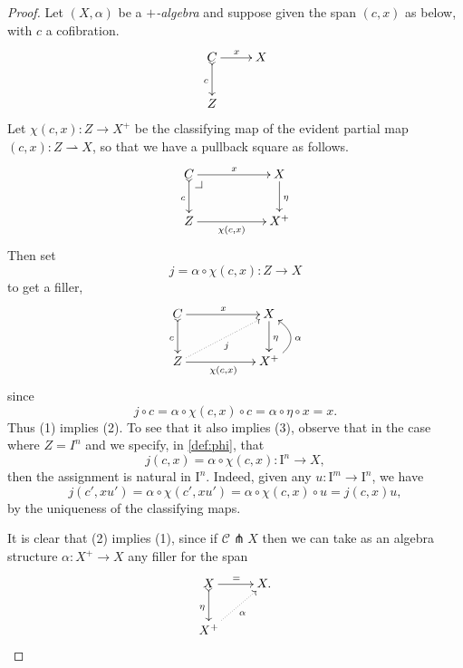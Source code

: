 \documentclass[12pt]{article}
\makeatletter
\newcommand{\ra}{\ensuremath{\rightarrow}}
\newcommand{\I}{\ensuremath{\mathrm{I}}}
\theoremstyle{remark}
\theoremstyle{definition}
\newcommand{\pbcorner}[1][dr]{\save*!/#1-1.2pc/#1:(-1,1)@^{|-}\restore}
\makeatother
\begin{document}
\begin{proof}
Let $(X, \alpha)$ be a \emph{$+$-algebra} and suppose given the span $(c,x)$ as below, with $c$ a cofibration. 
\begin{equation*}%
\xymatrix{
C \ar@{>->}[d]_{c} \ar[r]^{x} & X \\
Z &
}
\end{equation*}
Let $\chi(c,x): Z\ra X^+$ be the classifying map of the evident partial map $(c,x) : Z\rightharpoonup X$, so that we have a pullback square as follows.
\begin{equation}\label{diagram:defphi}
\xymatrix{
C \ar@{>->}[d]_{c} \ar[rr]^{x} \pbcorner && X \ar[d]^{\eta} \\
Z \ar[rr]_-{\chi(c,x)} && X^+
}
\end{equation}
Then set
\begin{equation}\label{def:phi}
j = \alpha\circ\chi(c,x) : Z\ra X
\end{equation}
to get a filler,
\begin{equation}\label{diagram:defphi}
\xymatrix{
C \ar@{>->}[d]_{c} \ar[rr]^{x} && X \ar[d]^{\eta} \\
Z\ar@{.>}[rru]_{j} \ar[rr]_{\chi(c,x)} && X^+  \ar@/_4ex/ [u]_\alpha
}
\end{equation}
since $$j\circ c = \alpha\circ\chi(c,x)\circ c = \alpha\circ\eta \circ x = x.$$ Thus (1) implies (2).  To see that it also implies (3), observe that in the case where $Z=I^n$ and we specify, in \eqref{def:phi}, that
\begin{equation}\label{def:j}
j(c,x) = \alpha\circ\chi(c,x) : \I^n\ra X,
\end{equation}
then the assignment is natural in $\I^n$. Indeed,  given any $u : \I^m \ra \I^n$, we have
\begin{equation}\label{eq:proof,uniformfillers}
j(c',xu') = \alpha\circ\chi(c',xu') = \alpha\circ\chi(c,x)\circ u = j(c,x) u,
\end{equation}
by the uniqueness of the classifying maps.

It is clear that (2) implies (1), since if $\mathcal{C} \pitchfork X$ then we can take as an algebra structure $\alpha : X^+ \ra X$ any filler for the span
\[
\xymatrix{
X \ar@{>->}[d]_{\eta} \ar[r]^{=} & X .\\
X^+ \ar@{.>}[ru]_\alpha&
}
\]


\end{proof}
\end{document}
